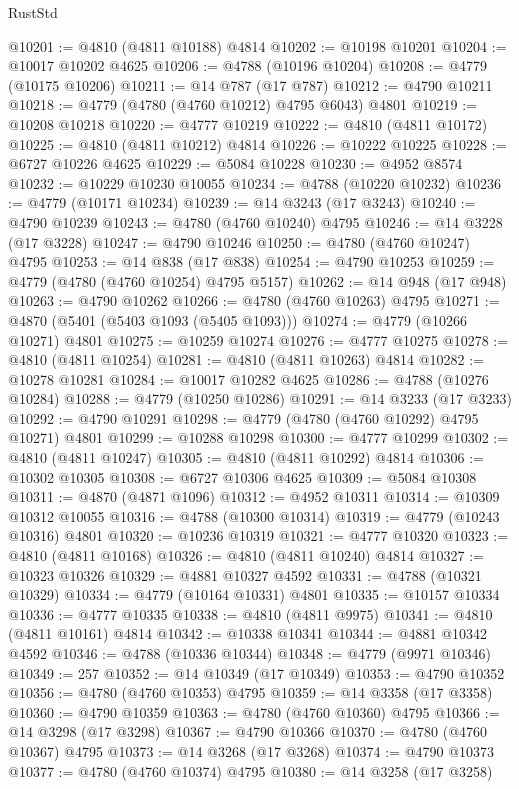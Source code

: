 \begin{lexlean}{RustStd}
\begin{coremodule}
@10201 := @4810 (@4811 @10188) @4814
@10202 := @10198 @10201
@10204 := @10017 @10202 @4625
@10206 := @4788 (@10196 @10204)
@10208 := @4779 (@10175 @10206)
@10211 := @14 @787 (@17 @787)
@10212 := @4790 @10211
@10218 := @4779 (@4780 (@4760 @10212) @4795 @6043) @4801
@10219 := @10208 @10218
@10220 := @4777 @10219
@10222 := @4810 (@4811 @10172)
@10225 := @4810 (@4811 @10212) @4814
@10226 := @10222 @10225
@10228 := @6727 @10226 @4625
@10229 := @5084 @10228
@10230 := @4952 @8574
@10232 := @10229 @10230 @10055
@10234 := @4788 (@10220 @10232)
@10236 := @4779 (@10171 @10234)
@10239 := @14 @3243 (@17 @3243)
@10240 := @4790 @10239
@10243 := @4780 (@4760 @10240) @4795
@10246 := @14 @3228 (@17 @3228)
@10247 := @4790 @10246
@10250 := @4780 (@4760 @10247) @4795
@10253 := @14 @838 (@17 @838)
@10254 := @4790 @10253
@10259 := @4779 (@4780 (@4760 @10254) @4795 @5157)
@10262 := @14 @948 (@17 @948)
@10263 := @4790 @10262
@10266 := @4780 (@4760 @10263) @4795
@10271 := @4870 (@5401 (@5403 @1093 (@5405 @1093)))
@10274 := @4779 (@10266 @10271) @4801
@10275 := @10259 @10274
@10276 := @4777 @10275
@10278 := @4810 (@4811 @10254)
@10281 := @4810 (@4811 @10263) @4814
@10282 := @10278 @10281
@10284 := @10017 @10282 @4625
@10286 := @4788 (@10276 @10284)
@10288 := @4779 (@10250 @10286)
@10291 := @14 @3233 (@17 @3233)
@10292 := @4790 @10291
@10298 := @4779 (@4780 (@4760 @10292) @4795 @10271) @4801
@10299 := @10288 @10298
@10300 := @4777 @10299
@10302 := @4810 (@4811 @10247)
@10305 := @4810 (@4811 @10292) @4814
@10306 := @10302 @10305
@10308 := @6727 @10306 @4625
@10309 := @5084 @10308
@10311 := @4870 (@4871 @1096)
@10312 := @4952 @10311
@10314 := @10309 @10312 @10055
@10316 := @4788 (@10300 @10314)
@10319 := @4779 (@10243 @10316) @4801
@10320 := @10236 @10319
@10321 := @4777 @10320
@10323 := @4810 (@4811 @10168)
@10326 := @4810 (@4811 @10240) @4814
@10327 := @10323 @10326
@10329 := @4881 @10327 @4592
@10331 := @4788 (@10321 @10329)
@10334 := @4779 (@10164 @10331) @4801
@10335 := @10157 @10334
@10336 := @4777 @10335
@10338 := @4810 (@4811 @9975)
@10341 := @4810 (@4811 @10161) @4814
@10342 := @10338 @10341
@10344 := @4881 @10342 @4592
@10346 := @4788 (@10336 @10344)
@10348 := @4779 (@9971 @10346)
@10349 := 257
@10352 := @14 @10349 (@17 @10349)
@10353 := @4790 @10352
@10356 := @4780 (@4760 @10353) @4795
@10359 := @14 @3358 (@17 @3358)
@10360 := @4790 @10359
@10363 := @4780 (@4760 @10360) @4795
@10366 := @14 @3298 (@17 @3298)
@10367 := @4790 @10366
@10370 := @4780 (@4760 @10367) @4795
@10373 := @14 @3268 (@17 @3268)
@10374 := @4790 @10373
@10377 := @4780 (@4760 @10374) @4795
@10380 := @14 @3258 (@17 @3258)

\end{coremodule}
\end{lexlean}
